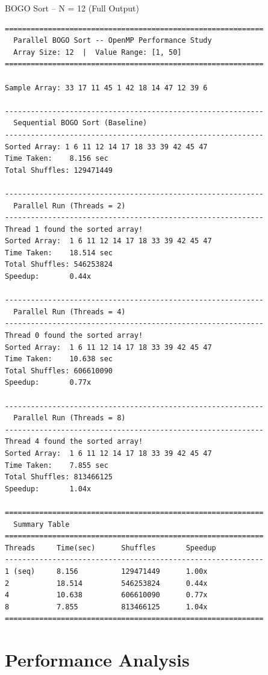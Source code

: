 \documentclass[11pt]{article}
\begin{document}
\begin{terminalbox}{BOGO Sort -- N = 12 (Full Output)}
\begin{lstlisting}[style=terminalstyle]
============================================================
  Parallel BOGO Sort -- OpenMP Performance Study
  Array Size: 12  |  Value Range: [1, 50]
============================================================

Sample Array: 33 17 11 45 1 42 18 14 47 12 39 6

------------------------------------------------------------
  Sequential BOGO Sort (Baseline)
------------------------------------------------------------
Sorted Array: 1 6 11 12 14 17 18 33 39 42 45 47
Time Taken:    8.156 sec
Total Shuffles: 129471449

------------------------------------------------------------
  Parallel Run (Threads = 2)
------------------------------------------------------------
Thread 1 found the sorted array!
Sorted Array:  1 6 11 12 14 17 18 33 39 42 45 47
Time Taken:    18.514 sec
Total Shuffles: 546253824
Speedup:       0.44x

------------------------------------------------------------
  Parallel Run (Threads = 4)
------------------------------------------------------------
Thread 0 found the sorted array!
Sorted Array:  1 6 11 12 14 17 18 33 39 42 45 47
Time Taken:    10.638 sec
Total Shuffles: 606610090
Speedup:       0.77x

------------------------------------------------------------
  Parallel Run (Threads = 8)
------------------------------------------------------------
Thread 4 found the sorted array!
Sorted Array:  1 6 11 12 14 17 18 33 39 42 45 47
Time Taken:    7.855 sec
Total Shuffles: 813466125
Speedup:       1.04x

============================================================
  Summary Table
============================================================
Threads     Time(sec)      Shuffles       Speedup
------------------------------------------------------------
1 (seq)     8.156          129471449      1.00x
2           18.514         546253824      0.44x
4           10.638         606610090      0.77x
8           7.855          813466125      1.04x
============================================================
\end{lstlisting}
\end{terminalbox}

\newpage

\section{Performance Analysis}
\end{document}
